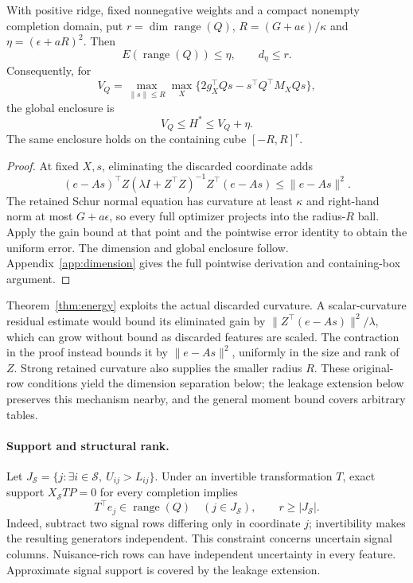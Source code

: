 \begin{theorem}\label{thm:energy}
With positive ridge, fixed nonnegative weights and a compact nonempty completion domain, put $r=\dim\operatorname{range}(Q)$, $R=(G+a\epsilon)/\kappa$ and $\eta=(\epsilon+aR)^2$. Then
\[
 E(\operatorname{range}(Q))\le\eta,\qquad d_\eta\le r.
\]
Consequently, for
\[
 V_Q=\max_{\|s\|\leq R}\max_X
 \{2g_X^\top Qs-s^\top Q^\top M_XQs\},
\]
the global enclosure is
\begin{equation}
 V_Q\leq H^*\leq V_Q+\eta.\label{eq:energy}
\end{equation}
The same enclosure holds on the containing cube $[-R,R]^r$.
\end{theorem}
\begin{proof}
At fixed $X,s$, eliminating the discarded coordinate adds
\[
 (e-As)^\top Z(\lambda I+Z^\top Z)^{-1}Z^\top(e-As)
 \le\|e-As\|^2.
\]
The retained Schur normal equation has curvature at least $\kappa$ and right-hand norm at most $G+a\epsilon$, so every full optimizer projects into the radius-$R$ ball. Apply the gain bound at that point and the pointwise error identity to obtain the uniform error. The dimension and global enclosure follow. Appendix~\ref{app:dimension} gives the full pointwise derivation and containing-box argument.
\end{proof}

Theorem~\ref{thm:energy} exploits the actual discarded curvature. A scalar-curvature residual estimate would bound its eliminated gain by $\|Z^\top(e-As)\|^2/\lambda$, which can grow without bound as discarded features are scaled. The contraction in the proof instead bounds it by $\|e-As\|^2$, uniformly in the size and rank of $Z$. Strong retained curvature also supplies the smaller radius $R$. These original-row conditions yield the dimension separation below; the leakage extension below preserves this mechanism nearby, and the general moment bound covers arbitrary tables.


\paragraph{Support and structural rank.}
Let $J_{\mathcal S}=\{j:\exists i\in\mathcal S,\ U_{ij}>L_{ij}\}$. Under an invertible transformation $T$, exact support $X_{\mathcal S}TP=0$ for every completion implies
\[
 T^\top e_j\in\operatorname{range}(Q)\quad(j\in J_{\mathcal S}),
 \qquad r\geq |J_{\mathcal S}|.
\]
Indeed, subtract two signal rows differing only in coordinate $j$; invertibility makes the resulting generators independent. This constraint concerns uncertain signal columns. Nuisance-rich rows can have independent uncertainty in every feature. Approximate signal support is covered by the leakage extension.

